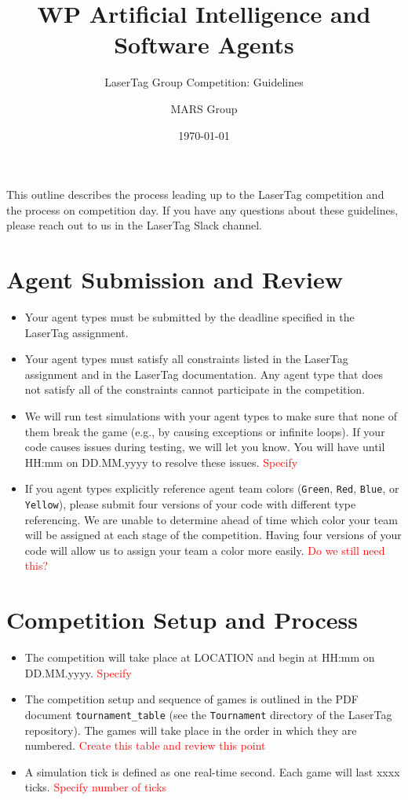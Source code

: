 \documentclass[
    a4paper,
    english,
    DIV=16,
    11pt,
    parskip=half,
]{scrartcl}
\title{WP Artificial Intelligence and Software Agents}
\subtitle{LaserTag Group Competition: Guidelines}
\author{MARS Group}
\date{\today}
\newcommand\todo[1]{\textcolor{red}{#1}}
\begin{document}
\maketitle

This outline describes the process leading up to the LaserTag competition and the process on competition day. If you have any questions about these guidelines, please reach out to us in the LaserTag Slack channel.

\section*{Agent Submission and Review}
\begin{itemize}
  \item Your agent types must be submitted by the deadline specified in the LaserTag assignment.
  \item Your agent types must satisfy all constraints listed in the LaserTag assignment and in the LaserTag documentation. Any agent type that does not satisfy all of the constraints cannot participate in the competition.
  \item We will run test simulations with your agent types to make sure that none of them break the game (e.g., by causing exceptions or infinite loops). If your code causes issues during testing, we will let you know. You will have until HH:mm on DD.MM.yyyy to resolve these issues. \todo{Specify}
  \item If you agent types explicitly reference agent team colors (\texttt{Green}, \texttt{Red}, \texttt{Blue}, or \texttt{Yellow}), please submit four versions of your code with different type referencing. We are unable to determine ahead of time which color your team will be assigned at each stage of the competition. Having four versions of your code will allow us to assign your team a color more easily. \todo{Do we still need this?}
\end{itemize}

\section*{Competition Setup and Process}
\begin{itemize}
  \item The competition will take place at LOCATION and begin at HH:mm on DD.MM.yyyy. \todo{Specify}
  \item The competition setup and sequence of games is outlined in the PDF document \texttt{tournament\_table} (see the \texttt{Tournament} directory of the LaserTag repository). The games will take place in the order in which they are numbered. \todo{Create this table and review this point}
  \item A simulation tick is defined as one real-time second. Each game will last xxxx ticks. \todo{Specify number of ticks}
\end{itemize}
\end{document}
